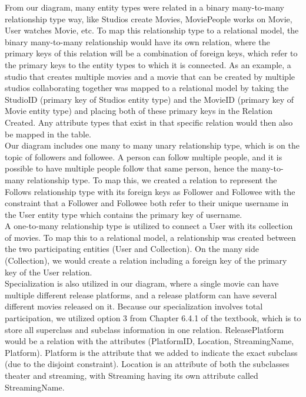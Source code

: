 \documentclass[12pt]{article}
\begin{document}
From our diagram, many entity types were related in a binary many-to-many relationship type way, like Studios create Movies, MoviePeople works on Movie, User watches Movie, etc. To map this relationship type to a relational model, the binary many-to-many relationship would have its own relation, where the primary keys of this relation will be a combination of foreign keys, which refer to the primary keys to the entity types to which it is connected. As an example, a studio that creates multiple movies and a movie that can be created by multiple studios collaborating together was mapped to a relational model by taking the StudioID (primary key of Studios entity type) and the MovieID (primary key of Movie entity type) and placing both of these primary keys in the Relation Created. Any attribute types that exist in that specific relation would then also be mapped in the table.\\

Our diagram includes one many to many unary relationship type, which is on the topic of followers and followee. A person can follow multiple people, and it is possible to have multiple people follow that same person, hence the many-to-many relationship type. To map this, we created a relation to represent the Follows relationship type with its foreign keys as Follower and Followee with the constraint that a Follower and Followee both refer to their unique username in the User entity type which contains the primary key of username. \\

A one-to-many relationship type is utilized to connect a User with its collection of movies. To map this to a relational model, a relationship was created between the two participating entities (User and Collection). On the many side (Collection), we would create a relation including a foreign key of the primary key of the User relation.\\

Specialization is also utilized in our diagram, where a single movie can have multiple different release platforms, and a release platform can have several different movies released on it. Because our specialization involves total participation, we utilized option 3 from Chapter 6.4.1 of the textbook, which is to store all superclass and subclass information in one relation. ReleasePlatform would be a relation with the attributes (PlatformID, Location, StreamingName, Platform). Platform is the attribute that we added to indicate the exact subclass (due to the disjoint constraint). Location is an attribute of both the subclasses theater and streaming, with Streaming having its own attribute called StreamingName.
\end{document}
